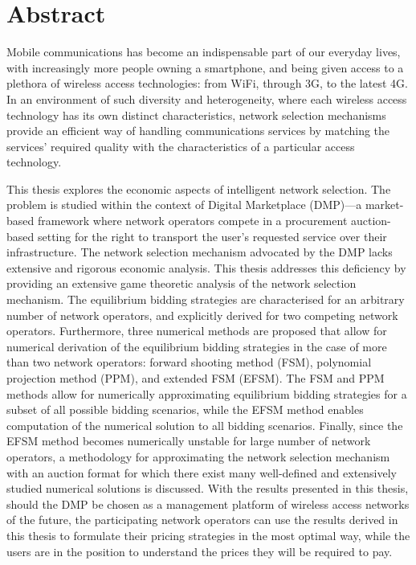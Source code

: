 \chapter*{Abstract} %
\label{cha:abstract}
\mtcaddchapter[Abstract]

Mobile communications has become an indispensable part of our everyday lives, with increasingly more people owning a smartphone, and being given access to a plethora of wireless access technologies: from WiFi, through 3G, to the latest 4G. In an environment of such diversity and heterogeneity, where each wireless access technology has its own distinct characteristics, network selection mechanisms provide an efficient way of handling communications services by matching the services' required quality with the characteristics of a particular access technology.

This thesis explores the economic aspects of intelligent network selection. The problem is studied within the context of Digital Marketplace (DMP)---a market-based framework where network operators compete in a procurement auction-based setting for the right to transport the user's requested service over their infrastructure. The network selection mechanism advocated by the DMP lacks extensive and rigorous economic analysis. This thesis addresses this deficiency by providing an extensive game theoretic analysis of the network selection mechanism. The equilibrium bidding strategies are characterised for an arbitrary number of network operators, and explicitly derived for two competing network operators. Furthermore, three numerical methods are proposed that allow for numerical derivation of the equilibrium bidding strategies in the case of more than two network operators: forward shooting method (FSM), polynomial projection method (PPM), and extended FSM (EFSM). The FSM and PPM methods allow for numerically approximating equilibrium bidding strategies for a subset of all possible bidding scenarios, while the EFSM method enables computation of the numerical solution to all bidding scenarios. Finally, since the EFSM method becomes numerically unstable for large number of network operators, a methodology for approximating the network selection mechanism with an auction format for which there exist many well-defined and extensively studied numerical solutions is discussed. With the results presented in this thesis, should the DMP be chosen as a management platform of wireless access networks of the future, the participating network operators can use the results derived in this thesis to formulate their pricing strategies in the most optimal way, while the users are in the position to understand the prices they will be required to pay.
